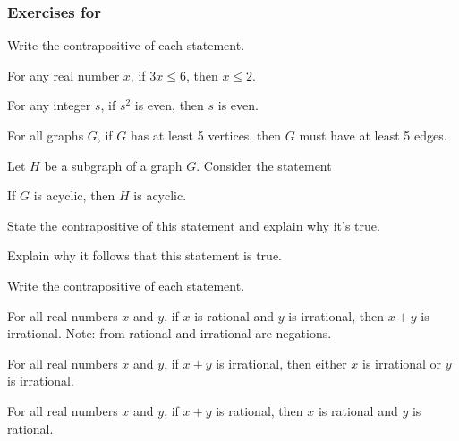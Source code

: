 

\subsubsection*{Exercises for  \subcp}

\begin{exer}[\exerP] %
\label{exer_cp_assorted}
Write the contrapositive of each statement.
    \begin{exerpart}
        \item For any real number $x$, if $3x \le 6$, then $x \le 2$.
        \item For any integer $s$, if $s^2$ is even, then $s$ is even.
        \item For all graphs $G$, if $G$ has at least 5 vertices, then $G$ must have at least 5 edges.
    \end{exerpart}
\end{exer}

\begin{exer}[\exerU] %
\label{exer_subgraph_acyclic}
    Let $H$ be a subgraph of a graph $G$. Consider the statement
        \begin{center} If $G$ is acyclic, then $H$ is acyclic. \end{center}
        \begin{exerpart}
            \item State the contrapositive of this statement and explain why it's true.
            \item Explain why it follows that this statement is true.  %
        \end{exerpart}
\end{exer}

\begin{exer}[\exerU] %
\label{exer_cp_irrat}
Write the contrapositive of each statement.
    \begin{exerpart}
        \item For all real numbers $x$ and $y$, if $x$ is rational and $y$ is irrational, then $x+y$ is irrational.  Note: from  rational and irrational are negations.
        \item For all real numbers $x$ and $y$, if $x+y$ is irrational, then either $x$ is irrational or $y$ is irrational.
        \item For all real numbers $x$ and $y$, if $x+y$ is rational, then $x$ is rational and $y$ is rational.       
    \end{exerpart}
\end{exer}

